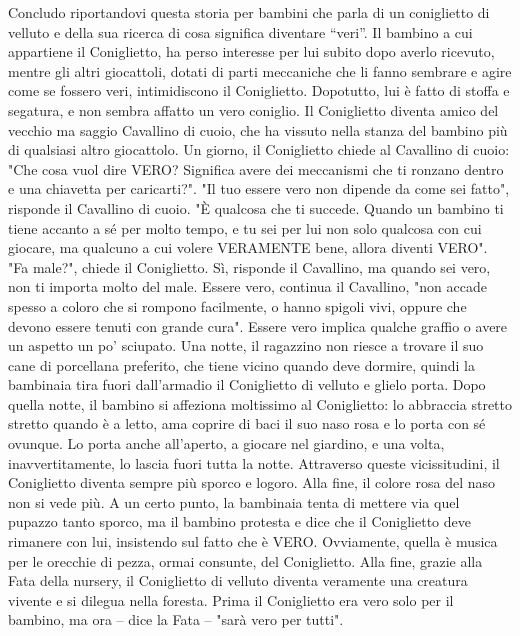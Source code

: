 \documentclass[12pt]{book} %
\begin{document}
Concludo riportandovi questa storia per bambini che parla di un coniglietto di velluto e della sua ricerca di cosa
significa diventare “veri”. Il bambino a cui appartiene il Coniglietto,
ha perso interesse per lui subito dopo averlo ricevuto, mentre gli altri giocattoli, dotati di parti meccaniche che li
fanno sembrare e agire come se fossero veri, intimidiscono il Coniglietto. Dopotutto, lui è fatto di stoffa e segatura,
e non sembra affatto un vero coniglio. Il Coniglietto diventa amico del vecchio ma saggio Cavallino di cuoio, che ha
vissuto nella stanza del bambino più di qualsiasi altro giocattolo. Un giorno, il Coniglietto chiede al Cavallino di
cuoio: "Che cosa vuol dire VERO? Significa avere dei meccanismi che ti ronzano dentro e una
chiavetta per caricarti?". "Il tuo essere vero non dipende da come sei
fatto", risponde il Cavallino di cuoio. "È qualcosa che ti succede. Quando un
bambino ti tiene accanto a sé per molto tempo, e tu sei per lui non solo qualcosa con cui giocare, ma qualcuno a cui
volere VERAMENTE bene, allora diventi VERO". "Fa male?",
chiede il Coniglietto. Sì, risponde il Cavallino, ma quando sei vero, non ti importa molto del male. Essere vero,
continua il Cavallino, "non accade spesso a coloro che si rompono facilmente, o hanno spigoli
vivi, oppure che devono essere tenuti con grande cura". Essere vero implica qualche graffio o
avere un aspetto un po' sciupato. Una notte, il ragazzino non riesce a trovare il suo cane di
porcellana preferito, che tiene vicino quando deve dormire, quindi la bambinaia tira fuori
dall'armadio il Coniglietto di velluto e glielo porta. Dopo quella notte, il bambino si affeziona
moltissimo al Coniglietto: lo abbraccia stretto stretto quando è a letto, ama coprire di baci il suo naso rosa e lo
porta con sé ovunque. Lo porta anche all'aperto, a giocare nel giardino, e una volta,
inavvertitamente, lo lascia fuori tutta la notte. Attraverso queste vicissitudini, il Coniglietto diventa sempre più
sporco e logoro. Alla fine, il colore rosa del naso non si vede più. A un certo punto, la bambinaia tenta di mettere
via quel pupazzo tanto sporco, ma il bambino protesta e dice che il Coniglietto deve rimanere con lui, insistendo sul
fatto che è VERO. Ovviamente, quella è musica per le orecchie di pezza, ormai consunte, del Coniglietto. Alla fine,
grazie alla Fata della nursery, il Coniglietto di velluto diventa veramente una creatura vivente e si dilegua nella
foresta. Prima il Coniglietto era vero solo per il bambino, ma ora – dice la Fata – "sarà vero per
tutti".
\end{document}
